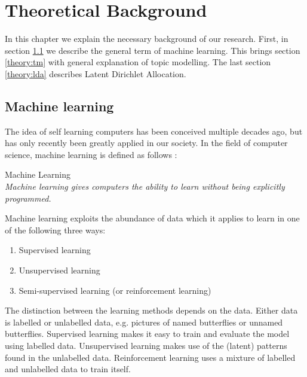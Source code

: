 \chapter{Theoretical Background}  \label{ch:theory}

In this chapter we explain the necessary background of our research. First, in section \ref{theory:machinelearning} we describe the general term of machine learning. This brings section \ref{theory:tm} with general explanation of topic modelling. The last section \ref{theory:lda} describes Latent Dirichlet Allocation.

\section{Machine learning} \label{theory:machinelearning}
The idea of self learning computers has been conceived multiple decades ago, but has only recently been greatly applied in our society.
In the field of computer science, machine learning is defined as follows \cite{Samuel1959SomeCheckers}:\\

\theoremstyle{definition} 
\begin{definition}{Machine Learning} 
\\\textit{Machine learning gives computers the ability to learn without being explicitly programmed.}
\end{definition}

\noindent Machine learning exploits the abundance of data which it applies to learn in one of the following three ways:

\begin{enumerate}
    \item Supervised learning
    \item Unsupervised learning
    \item Semi-supervised learning (or reinforcement learning)
\end{enumerate}

The distinction between the learning methods depends on the data. Either data is labelled or unlabelled data, e.g. pictures of named butterflies or unnamed butterflies. Supervised learning makes it easy to train and evaluate the model using labelled data. Unsupervised learning makes use of the (latent) patterns found in the unlabelled data. Reinforcement learning uses a mixture of labelled and unlabelled data to train itself. 

